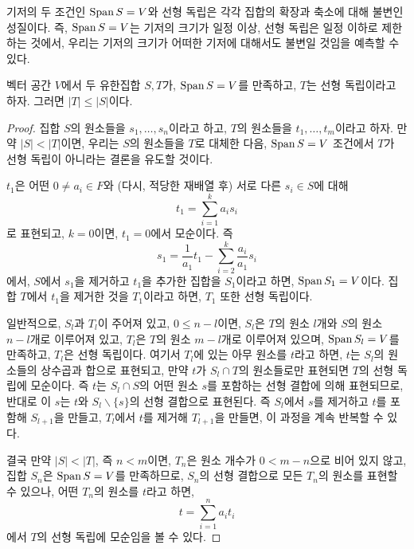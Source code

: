 기저의 두 조건인 $\operatorname{Span} S = V$와 선형 독립은 각각 집합의 확장과 축소에 대해 불변인 성질이다.
즉, $\operatorname{Span} S = V$는 기저의 크기가 일정 이상, 선형 독립은 일정 이하로 제한하는 것에서, 우리는 기저의 크기가 어떠한 기저에 대해서도 불변일 것임을 예측할 수 있다.
\begin{theorem}
\label{thm:spanindsiz}
    벡터 공간 $V$에서 두 유한집합 $S, T$가, $\operatorname{Span} S = V$를 만족하고, $T$는 선형 독립이라고 하자.
    그러면 $|T| \leq |S|$이다.
\end{theorem}
\begin{proof}
    집합 $S$의 원소들을 $s_1, \dots, s_n$이라고 하고, $T$의 원소들을 $t_1, \dots, t_m$이라고 하자.
    만약 $|S| < |T|$이면, 우리는 $S$의 원소들을 $T$로 대체한 다음, $\operatorname{Span} S = V$ 조건에서 $T$가 선형 독립이 아니라는 결론을 유도할 것이다.

    $t_1$은 어떤 $0 \neq a_i \in F$와 (다시, 적당한 재배열 후) 서로 다른 $s_i \in S$에 대해
    \begin{equation*}
        t_1 = \sum_{i = 1}^k a_i s_i
    \end{equation*}
    로 표현되고, $k = 0$이면, $t_1 = 0$에서 모순이다.
    즉
    \begin{equation*}
        s_1 = \frac{1}{a_1} t_1 - \sum_{i = 2}^k \frac{a_i}{a_1} s_i
    \end{equation*}
    에서, $S$에서 $s_1$을 제거하고 $t_1$을 추가한 집합을 $S_1$이라고 하면, $\operatorname{Span} S_1 = V$이다.
    집합 $T$에서 $t_1$을 제거한 것을 $T_1$이라고 하면, $T_1$ 또한 선형 독립이다.

    일반적으로, $S_l$과 $T_l$이 주어져 있고, $0 \leq n - l$이면, $S_l$은 $T$의 원소 $l$개와 $S$의 원소 $n - l$개로 이루어져 있고, $T_l$은 $T$의 원소 $m - l$개로 이루어져 있으며, $\operatorname{Span} S_l = V$를 만족하고, $T_l$은 선형 독립이다.
    여기서 $T_l$에 있는 아무 원소를 $t$라고 하면, $t$는 $S_l$의 원소들의 상수곱과 합으로 표현되고, 만약 $t$가 $S_l \cap T$의 원소들로만 표현되면 $T$의 선형 독립에 모순이다.
    즉 $t$는 $S_l \cap S$의 어떤 원소 $s$를 포함하는 선형 결합에 의해 표현되므로, 반대로 이 $s$는 $t$와 $S_l \backslash \{s\}$의 선형 결합으로 표현된다.
    즉 $S_l$에서 $s$를 제거하고 $t$를 포함해 $S_{l + 1}$을 만들고, $T_l$에서 $t$를 제거해 $T_{l + 1}$을 만들면, 이 과정을 계속 반복할 수 있다.

    결국 만약 $|S| < |T|$, 즉 $n < m$이면, $T_n$은 원소 개수가 $0 < m - n$으로 비어 있지 않고, 집합 $S_n$은 $\operatorname{Span} S = V$를 만족하므로, $S_n$의 선형 결합으로 모든 $T_n$의 원소를 표현할 수 있으나, 어떤 $T_n$의 원소를 $t$라고 하면,
    \begin{equation*}
        t = \sum_{i = 1}^n a_i t_i
    \end{equation*}
    에서 $T$의 선형 독립에 모순임을 볼 수 있다.
\end{proof}

